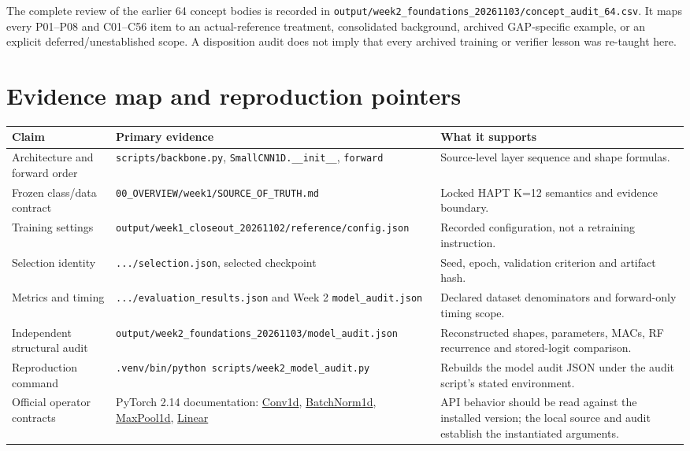 \documentclass[11pt,a4paper]{article}
\newcommand{\code}[1]{{\small\ttfamily\nolinkurl{#1}}}
\begin{document}
The complete review of the earlier 64 concept bodies is recorded in \code{output/week2_foundations_20261103/concept_audit_64.csv}. It maps every P01--P08 and C01--C56 item to an actual-reference treatment, consolidated background, archived GAP-specific example, or an explicit deferred/unestablished scope. A disposition audit does not imply that every archived training or verifier lesson was re-taught here.

\clearpage
\section{Evidence map and reproduction pointers}
\begin{longtable}{@{}P{3.3cm}P{5.4cm}P{7cm}@{}}\toprule Claim & Primary evidence & What it supports\\\midrule\endhead
Architecture and forward order & \code{scripts/backbone.py}, \code{SmallCNN1D.__init__}, \code{forward} & Source-level layer sequence and shape formulas.\\
Frozen class/data contract & \code{00_OVERVIEW/week1/SOURCE_OF_TRUTH.md} & Locked HAPT K=12 semantics and evidence boundary.\\
Training settings & \code{output/week1_closeout_20261102/reference/config.json} & Recorded configuration, not a retraining instruction.\\
Selection identity & \code{.../selection.json}, selected checkpoint & Seed, epoch, validation criterion and artifact hash.\\
Metrics and timing & \code{.../evaluation_results.json} and Week 2 \code{model_audit.json} & Declared dataset denominators and forward-only timing scope.\\
Independent structural audit & \code{output/week2_foundations_20261103/model_audit.json} & Reconstructed shapes, parameters, MACs, RF recurrence and stored-logit comparison.\\
Reproduction command & \code{.venv/bin/python scripts/week2_model_audit.py} & Rebuilds the model audit JSON under the audit script's stated environment.\\
Official operator contracts & PyTorch 2.14 documentation: \href{https://docs.pytorch.org/docs/2.14/generated/torch.nn.Conv1d.html}{Conv1d}, \href{https://docs.pytorch.org/docs/2.14/generated/torch.nn.BatchNorm1d.html}{BatchNorm1d}, \href{https://docs.pytorch.org/docs/2.14/generated/torch.nn.MaxPool1d.html}{MaxPool1d}, \href{https://docs.pytorch.org/docs/2.14/generated/torch.nn.Linear.html}{Linear} & API behavior should be read against the installed version; the local source and audit establish the instantiated arguments.\\
\bottomrule\end{longtable}
\end{document}
